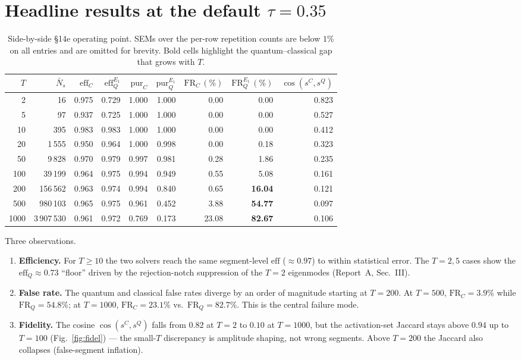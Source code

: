 \documentclass[11pt,a4paper]{article}
\newcommand{\eff}{\mathrm{eff}}
\newcommand{\FR}{\mathrm{FR}}
\newcommand{\sQ}{s^{Q}}
\newcommand{\sC}{s^{C}}
\begin{document}
\section{Headline results at the default $\tau = 0.35$}
\label{sec:headline}

\begin{table}[h]
\centering
\small
\caption{Side-by-side §14e operating point. SEMs over the per-row repetition counts are
below $1\%$ on all entries and are omitted for brevity. Bold cells highlight the
quantum--classical gap that grows with $T$.}
\label{tab:head}
\begin{tabular}{rrrrrrrrr}
\toprule
$T$ & $\bar N_s$
    & $\eff_C$ & $\eff_Q^{E_1}$
    & $\mathrm{pur}_C$ & $\mathrm{pur}_Q^{E_1}$
    & $\FR_C\,(\%)$ & $\FR_Q^{E_1}\,(\%)$ & $\cos(\sC,\sQ)$ \\
\midrule
2     & 16          & 0.975 & 0.729 & 1.000 & 1.000 & 0.00  & 0.00  & 0.823 \\
5     & 97          & 0.937 & 0.725 & 1.000 & 1.000 & 0.00  & 0.00  & 0.527 \\
10    & 395         & 0.983 & 0.983 & 1.000 & 1.000 & 0.00  & 0.00  & 0.412 \\
20    & 1\,555      & 0.950 & 0.964 & 1.000 & 0.998 & 0.00  & 0.18  & 0.323 \\
50    & 9\,828      & 0.970 & 0.979 & 0.997 & 0.981 & 0.28  & 1.86  & 0.235 \\
100   & 39\,199     & 0.964 & 0.975 & 0.994 & 0.949 & 0.55  & 5.08  & 0.161 \\
200   & 156\,562    & 0.963 & 0.974 & 0.994 & 0.840 & 0.65  & \textbf{16.04} & 0.121 \\
500   & 980\,103    & 0.965 & 0.975 & 0.961 & 0.452 & 3.88  & \textbf{54.77} & 0.097 \\
1000  & 3\,907\,530 & 0.961 & 0.972 & 0.769 & 0.173 & 23.08 & \textbf{82.67} & 0.106 \\
\bottomrule
\end{tabular}
\end{table}

Three observations.
\begin{enumerate}
\item \textbf{Efficiency.} For $T \ge 10$ the two solvers reach the same segment-level
$\eff$ ($\approx 0.97$) to within statistical error. The $T = 2, 5$ cases show the
$\eff_Q \approx 0.73$ ``floor'' driven by the rejection-notch suppression of the
$T = 2$ eigenmodes (Report~A, Sec.~III).
\item \textbf{False rate.} The quantum and classical false rates diverge by an order of
magnitude starting at $T = 200$. At $T = 500$, $\FR_C = 3.9\%$ while $\FR_Q = 54.8\%$;
at $T = 1000$, $\FR_C = 23.1\%$ vs.\ $\FR_Q = 82.7\%$. This is the central failure mode.
\item \textbf{Fidelity.} The cosine $\cos(\sC, \sQ)$ falls from $0.82$ at $T = 2$ to
$0.10$ at $T = 1000$, but the activation-set Jaccard stays above $0.94$ up to $T = 100$
(Fig.~\ref{fig:fidel}) --- the small-$T$ discrepancy is amplitude shaping, not wrong
segments. Above $T = 200$ the Jaccard also collapses (false-segment inflation).
\end{enumerate}
\end{document}
